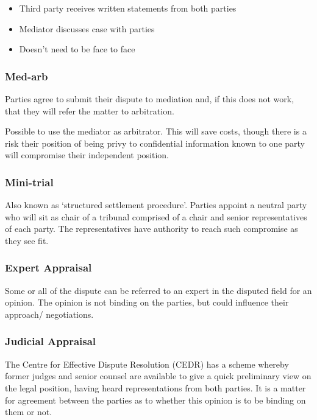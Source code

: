 \documentclass[
]{article}
\providecommand{\tightlist}{%
  \setlength{\itemsep}{0pt}\setlength{\parskip}{0pt}}
\begin{document}
\begin{itemize}
\tightlist
\item
  Third party receives written statements from both parties
\item
  Mediator discusses case with parties
\item
  Doesn't need to be face to face
\end{itemize}

\hypertarget{med-arb}{%
\subsubsection{Med-arb}\label{med-arb}}

Parties agree to submit their dispute to mediation and, if this does not
work, that they will refer the matter to arbitration.

Possible to use the mediator as arbitrator. This will save costs, though
there is a risk their position of being privy to confidential
information known to one party will compromise their independent
position.

\hypertarget{mini-trial}{%
\subsubsection{Mini-trial}\label{mini-trial}}

Also known as `structured settlement procedure'. Parties appoint a
neutral party who will sit as chair of a tribunal comprised of a chair
and senior representatives of each party. The representatives have
authority to reach such compromise as they see fit.

\hypertarget{expert-appraisal}{%
\subsubsection{Expert Appraisal}\label{expert-appraisal}}

Some or all of the dispute can be referred to an expert in the disputed
field for an opinion. The opinion is not binding on the parties, but
could influence their approach/ negotiations.

\hypertarget{judicial-appraisal}{%
\subsubsection{Judicial Appraisal}\label{judicial-appraisal}}

The Centre for Effective Dispute Resolution (CEDR) has a scheme whereby
former judges and senior counsel are available to give a quick
preliminary view on the legal position, having heard representations
from both parties. It is a matter for agreement between the parties as
to whether this opinion is to be binding on them or not.
\end{document}
